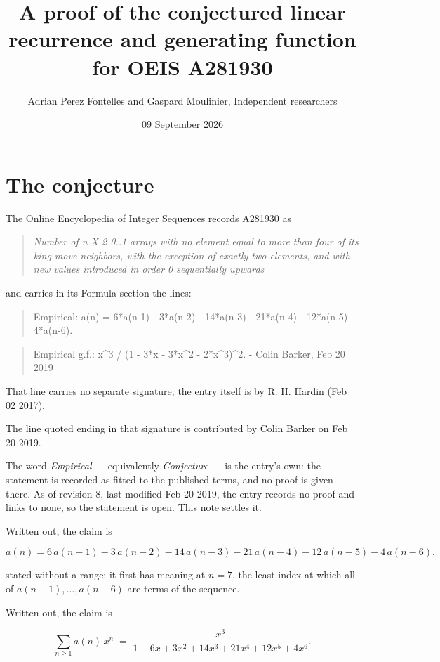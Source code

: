 \documentclass[11pt]{article}
\title{A proof of the conjectured linear recurrence and generating function for OEIS A281930}
\author{Adrian Perez Fontelles and Gaspard Moulinier, Independent researchers}
\date{09 September 2026}
\theoremstyle{definition}
\begin{document}
\maketitle
\section{The conjecture}

The Online Encyclopedia of Integer Sequences records \href{https://oeis.org/A281930}{A281930} as

\begin{quote}\itshape Number of n X 2 0..1 arrays with no element equal to more than four of its king-move neighbors, with the exception of exactly two elements, and with new values introduced in order 0 sequentially upwards\end{quote}

and carries in its Formula section the lines:

\begin{quote}\ttfamily Empirical: a(n) = 6*a(n-1) - 3*a(n-2) - 14*a(n-3) - 21*a(n-4) - 12*a(n-5) - 4*a(n-6).\end{quote}

\begin{quote}\ttfamily Empirical g.f.: x\textasciicircum{}3 / (1 - 3*x - 3*x\textasciicircum{}2 - 2*x\textasciicircum{}3)\textasciicircum{}2. - Colin Barker, Feb 20 2019\end{quote}

That line carries no separate signature; the entry itself is by R. H. Hardin (Feb 02 2017).

The line quoted ending in that signature is contributed by Colin Barker on Feb 20 2019.

The word {\itshape Empirical} --- equivalently {\itshape Conjecture} --- is the entry's own: the statement is recorded as fitted to the published terms, and no proof is given there. As of revision 8, last modified Feb 20 2019, the entry records no proof and links to none, so the statement is open. This note settles it.

Written out, the claim is

\[a(n) = 6\,a(n-1) - 3\,a(n-2) - 14\,a(n-3) - 21\,a(n-4) - 12\,a(n-5) - 4\,a(n-6).\]

stated without a range; it first has meaning at $n = 7$, the least index at which all of $a(n-1),\dots,a(n-6)$ are terms of the sequence.

Written out, the claim is

\[\sum_{n \ge 1} a(n)\,x^n \;=\; \frac{x^{3}}{1 - 6x + 3x^{2} + 14x^{3} + 21x^{4} + 12x^{5} + 4x^{6}}.\]
\end{document}
